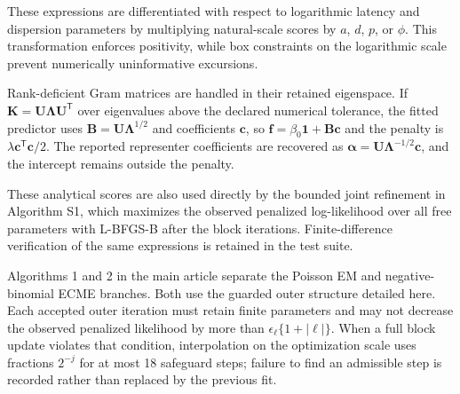 \documentclass[11pt]{article}
\begin{document}
These expressions are differentiated with respect to logarithmic latency and dispersion parameters by multiplying natural-scale scores by $a$, $d$, $p$, or $\phi$. This transformation enforces positivity, while box constraints on the logarithmic scale prevent numerically uninformative excursions.

Rank-deficient Gram matrices are handled in their retained eigenspace. If $\bm{K}=\bm{U}\bm{\Lambda}\bm{U}^{\mathsf T}$ over eigenvalues above the declared numerical tolerance, the fitted predictor uses $\bm{B}=\bm{U}\bm{\Lambda}^{1/2}$ and coefficients $\bm{c}$, so $\bm{f}=\beta_0\bm{1}+\bm{B}\bm{c}$ and the penalty is $\lambda\bm{c}^{\mathsf T}\bm{c}/2$. The reported representer coefficients are recovered as $\bm{\alpha}=\bm{U}\bm{\Lambda}^{-1/2}\bm{c}$, and the intercept remains outside the penalty.

These analytical scores are also used directly by the bounded joint refinement in Algorithm S1, which maximizes the observed penalized log-likelihood over all free parameters with L-BFGS-B after the block iterations. Finite-difference verification of the same expressions is retained in the test suite.

Algorithms 1 and 2 in the main article separate the Poisson EM and negative-binomial ECME branches. Both use the guarded outer structure detailed here. Each accepted outer iteration must retain finite parameters and may not decrease the observed penalized likelihood by more than $\epsilon_{\ell}\{1+|\ell|\}$. When a full block update violates that condition, interpolation on the optimization scale uses fractions $2^{-j}$ for at most 18 safeguard steps; failure to find an admissible step is recorded rather than replaced by the previous fit.
\end{document}
